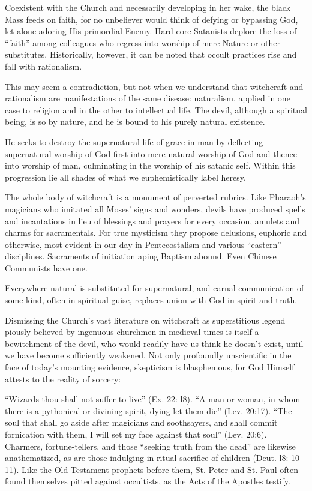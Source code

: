 Coexistent with the Church and necessarily developing in her wake, the black Mass feeds on faith, for no unbeliever would think of defying or bypassing God, let alone adoring His primordial Enemy. Hard-core Satanists deplore the loss of ``faith'' among colleagues who regress into worship of mere Nature or other substitutes. Historically, however, it can be noted that occult practices rise and fall with rationalism.

This may seem a contradiction, but not when we understand that witchcraft and rationalism are manifestations of the same disease: naturalism, applied in one case to religion and in the other to intellectual life. The devil, although a spiritual being, is so by nature, and he is bound to his purely natural existence.

He seeks to destroy the supernatural life of grace in man by deflecting supernatural worship of God first into mere natural worship of God and thence into worship of man, culminating in the worship of his satanic self. Within this progression lie all shades of what we euphemistically label heresy.

The whole body of witchcraft is a monument of perverted rubrics. Like Pharaoh's magicians who imitated all Moses' signs and wonders, devils have produced spells and incantations in lieu of blessings and prayers for every occasion, amulets and charms for sacramentals. For true mysticism they propose delusions, euphoric and otherwise, most evident in our day in Pentecostalism and various ``eastern'' disciplines. Sacraments of initiation aping Baptism abound. Even Chinese Communists have one.

Everywhere natural is substituted for supernatural, and carnal communication of some kind, often in spiritual guise, replaces union with God in spirit and truth.

Dismissing the Church's vast literature on witchcraft as superstitious legend piously believed by ingenuous churchmen in medieval times is itself a bewitchment of the devil, who would readily have us think he doesn't exist, until we have become sufficiently weakened. Not only profoundly unscientific in the face of today's mounting evidence, skepticism is blasphemous, for God Himself attests to the reality of sorcery:

``Wizards thou shall not suffer to live'' (Ex. 22: l8). ``A man or woman, in whom there is a pythonical or divining spirit, dying let them die'' (Lev. 20:17). ``The soul that shall go aside after magicians and soothsayers, and shall commit fornication with them, I will set my face against that soul'' (Lev. 20:6). Charmers, fortune-tellers, and those ``seeking truth from the dead'' are likewise anathematized, as are those indulging in ritual sacrifice of children (Deut. l8: 10-11). Like the Old Testament prophets before them, St. Peter and St. Paul often found themselves pitted against occultists, as the Acts of the Apostles testify.

